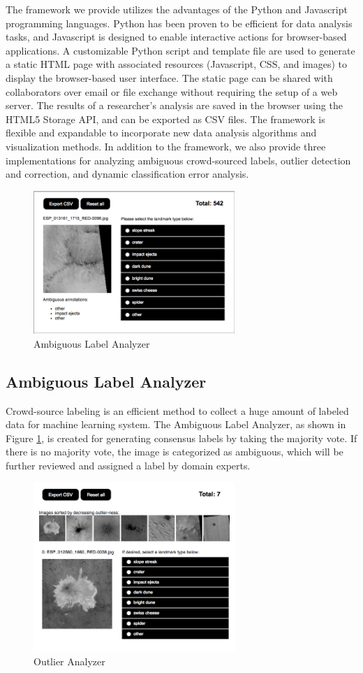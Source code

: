 The framework we provide utilizes the advantages of the Python and Javascript 
programming languages. Python has been proven to be efficient for data analysis 
tasks, and Javascript is designed to enable interactive actions for browser-based 
applications. A customizable Python script and template file are used to generate 
a static HTML page with associated resources (Javascript, CSS, and images) to 
display the browser-based user interface. The static page can be shared with 
collaborators over email or file exchange without requiring the setup of a web 
server. The results of a researcher's analysis are saved in the browser using 
the HTML5 Storage API, and can be exported as CSV files. The framework is 
flexible and expandable to incorporate new data analysis algorithms and 
visualization methods. In addition to the framework, we also provide three 
implementations for analyzing ambiguous crowd-sourced labels, outlier detection 
and correction, and dynamic classification error analysis.

\begin{figure}
	\centering
	\includegraphics[width=3in]{images/ala-ui}
	\caption{Ambiguous Label Analyzer}
	\label{fig:ala}
\end{figure}


\subsection{Ambiguous Label Analyzer}
Crowd-source labeling is an efficient method to collect a huge amount of labeled 
data for machine learning system. The Ambiguous Label Analyzer, as shown in 
Figure \ref{fig:ala}, is created for generating consensus labels by taking the 
majority vote. If there is no majority vote, the image is categorized as ambiguous, 
which will be further reviewed and assigned a label by domain experts.  

\begin{figure}
        \centering
        \includegraphics[width=3in]{images/oia-ui}
        \caption{Outlier Analyzer}
        \label{fig:oia}
\end{figure}


